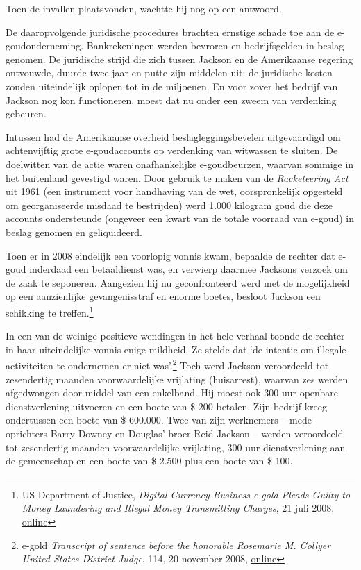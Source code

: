 \documentclass[
  a5paper,
  smalldemyvopaper,11pt,twoside,onecolumn,openright,extrafontsizes,
hidelinks]{memoir}
\begin{document}
Toen de invallen plaatsvonden, wachtte hij nog op een antwoord.

De daaropvolgende juridische procedures brachten ernstige schade toe aan
de e-goudonderneming. Bankrekeningen werden bevroren en bedrijfsgelden
in beslag genomen. De juridische strijd die zich tussen Jackson en de
Amerikaanse regering ontvouwde, duurde twee jaar en putte zijn middelen
uit: de juridische kosten zouden uiteindelijk oplopen tot in de
miljoenen. En voor zover het bedrijf van Jackson nog kon functioneren,
moest dat nu onder een zweem van verdenking gebeuren.

Intussen had de Amerikaanse overheid beslagleggingsbevelen uitgevaardigd
om achtenvijftig grote e-goudaccounts op verdenking van witwassen te
sluiten. De doelwitten van de actie waren onafhankelijke e-goudbeurzen,
waarvan sommige in het buitenland gevestigd waren. Door gebruik te maken
van de \emph{Racketeering Act} uit 1961 (een instrument voor handhaving
van de wet, oorspronkelijk opgesteld om georganiseerde misdaad te
bestrijden) werd 1.000 kilogram goud die deze accounts ondersteunde
(ongeveer een kwart van de totale voorraad van e-goud) in beslag genomen
en geliquideerd.

Toen er in 2008 eindelijk een voorlopig vonnis kwam, bepaalde de rechter
dat e-goud inderdaad een betaaldienst was, en verwierp daarmee Jacksons
verzoek om de zaak te seponeren. Aangezien hij nu geconfronteerd werd
met de mogelijkheid op een aanzienlijke gevangenisstraf en enorme
boetes, besloot Jackson een schikking te treffen.\footnote{\hspace{0pt}US
  Department of Justice, \emph{Digital Currency Business e-gold Pleads
  Guilty to Money Laundering and Illegal Money Transmitting Charges}, 21
  juli 2008,
  \href{https://www.justice.gov/archive/opa/pr/2008/July/08-crm-635.html}{online}}

In een van de weinige positieve wendingen in het hele verhaal toonde de
rechter in haar uiteindelijke vonnis enige mildheid. Ze stelde dat `de
intentie om illegale activiteiten te ondernemen er niet was'.\footnote{\hspace{0pt}e-gold
  \emph{Transcript of sentence before the honorable Rosemarie M. Collyer
  United States District Judge}, 114, 20 november 2008,
  \href{https://legalupdate.e-gold.com/2008/11/transcript-of-sentence-before-the-honorable-rosemarie-m-collyer-united-states-district-judge.html}{online}}
Toch werd Jackson veroordeeld tot zesendertig maanden voorwaardelijke
vrijlating (huisarrest), waarvan zes werden afgedwongen door middel van
een enkelband. Hij moest ook 300 uur openbare dienstverlening uitvoeren
en een boete van \$ 200 betalen. Zijn bedrijf kreeg ondertussen een
boete van \$ 600.000. Twee van zijn werknemers -- mede-oprichters Barry
Downey en Douglas' broer Reid Jackson -- werden veroordeeld tot
zesendertig maanden voorwaardelijke vrijlating, 300 uur dienstverlening
aan de gemeenschap en een boete van \$ 2.500 plus een boete van \$ 100.
\end{document}
